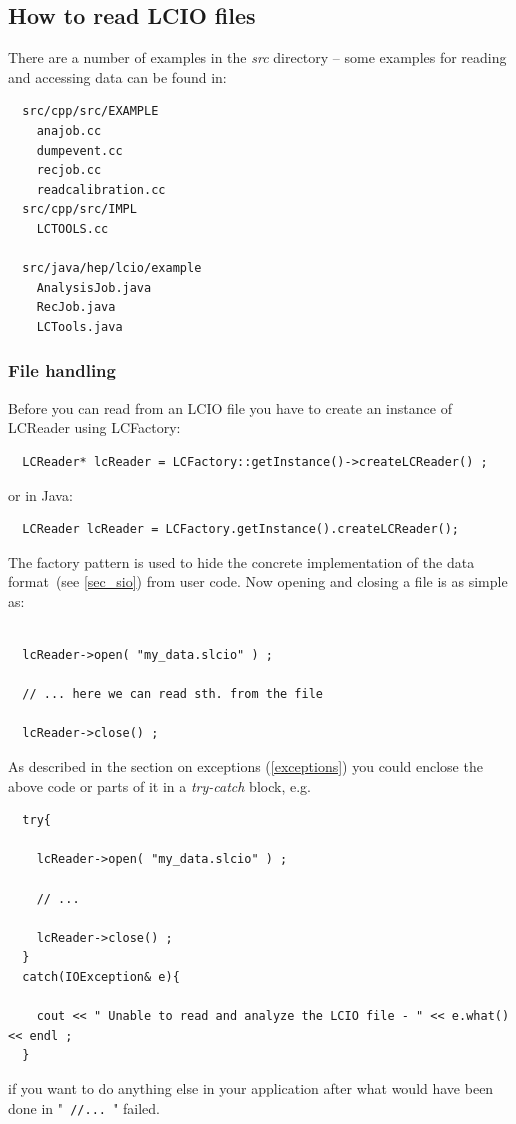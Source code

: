 \documentclass[twoside]{article}
\begin{document}
\subsection{How to read LCIO files} \label{read_examples} 
There are a number of examples in the {\em src} directory -- 
some examples for reading and accessing data can be found in:
\begin{verbatim}
  src/cpp/src/EXAMPLE
    anajob.cc
    dumpevent.cc
    recjob.cc
    readcalibration.cc
  src/cpp/src/IMPL
    LCTOOLS.cc

  src/java/hep/lcio/example
    AnalysisJob.java
    RecJob.java
    LCTools.java
\end{verbatim}

\subsubsection{File handling} 
Before you can read from an LCIO file you have to create an instance of LCReader using LCFactory:

\begin{verbatim}
  LCReader* lcReader = LCFactory::getInstance()->createLCReader() ;
\end{verbatim}
or in Java:
\begin{verbatim}
  LCReader lcReader = LCFactory.getInstance().createLCReader();
\end{verbatim}

The factory pattern is used to hide  the concrete implementation of the data 
format~(see \ref{sec_sio}) from user code.
Now opening and closing a file is as simple as:
\begin{verbatim}

  lcReader->open( "my_data.slcio" ) ;
    
  // ... here we can read sth. from the file 

  lcReader->close() ;

\end{verbatim}
As described in the section on exceptions (\ref{exceptions}) you could enclose the above code or parts 
of it in a {\em try-catch} block, e.g.

\begin{verbatim}
  try{
    
    lcReader->open( "my_data.slcio" ) ;
    
    // ...

    lcReader->close() ;
  }
  catch(IOException& e){

    cout << " Unable to read and analyze the LCIO file - " << e.what() << endl ;
  }
\end{verbatim}
if you want to do anything else in your application after what would have been done in 
"\verb$ //... $" failed.
\end{document}
